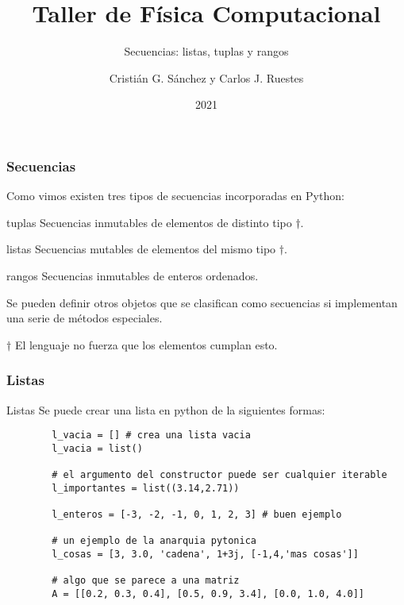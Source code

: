 \documentclass{beamer}
\title{Taller de Física Computacional}
\subtitle{Secuencias: listas, tuplas y rangos}
\author{Cristián G. Sánchez y Carlos J. Ruestes}
\date{2021}
\begin{document}
\frame{\titlepage}


\begin{frame}[fragile]
    \frametitle{Secuencias}
    Como vimos existen tres tipos de secuencias incorporadas en Python:
    \begin{block}{tuplas}
        Secuencias inmutables de elementos de distinto tipo $\dagger$.
    \end{block}
    \begin{block}{listas}
        Secuencias mutables de elementos del mismo tipo $\dagger$.
    \end{block}
    \begin{block}{rangos}
        Secuencias inmutables de enteros ordenados.
    \end{block}
    Se pueden definir otros objetos que se clasifican como secuencias si implementan una serie de métodos especiales.

    $\dagger$ El lenguaje no fuerza que los elementos cumplan esto.

\end{frame}


\begin{frame}[fragile]
    \frametitle{Listas}
    \begin{block}{Listas}
    Se puede crear una lista en python de la siguientes formas:
        \begin{verbatim}
        l_vacia = [] # crea una lista vacia
        l_vacia = list()

        # el argumento del constructor puede ser cualquier iterable
        l_importantes = list((3.14,2.71))

        l_enteros = [-3, -2, -1, 0, 1, 2, 3] # buen ejemplo

        # un ejemplo de la anarquia pytonica
        l_cosas = [3, 3.0, 'cadena', 1+3j, [-1,4,'mas cosas']]

        # algo que se parece a una matriz
        A = [[0.2, 0.3, 0.4], [0.5, 0.9, 3.4], [0.0, 1.0, 4.0]]
        \end{verbatim}
    \end{block}
    \end{frame}
    
\end{document}
